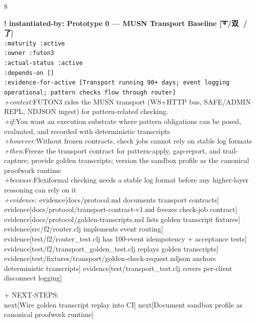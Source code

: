 \documentclass[landscape]{article}
\newcommand{\flexitag}[1]{\textcolor[gray]{0.35}{\textit{#1}}}
\newenvironment{devmapactive}{%
  \def\FrameCommand{\colorbox{devmapactivebg}}%
  \setlength{\fboxsep}{2pt}%
  \MakeFramed{\advance\hsize-\width \FrameRestore}%
}{\endMakeFramed}
\begin{document}
\begin{paracol}{8}
\par
\par
\begin{devmapactive}
\textbf{! instantiated-by: Prototype 0 — MUSN Transport Baseline [➰/双 🎑/了]}\\
  \texttt{:\allowbreak{}maturity :\allowbreak{}active}\\
  \texttt{:\allowbreak{}owner :\allowbreak{}futon3}\\
  \texttt{:\allowbreak{}actual-\allowbreak{}status :\allowbreak{}active}\\
  \texttt{:\allowbreak{}depends-\allowbreak{}on []}\\
  \texttt{:\allowbreak{}evidence-\allowbreak{}for-\allowbreak{}active [Transport running 90+\allowbreak{} days;\allowbreak{} event logging operational;\allowbreak{} pattern checks flow through router]}\\
  \flexitag{+context:}FUTON3 rides the MUSN transport (WS+HTTP bus, SAFE/ADMIN REPL, NDJSON ingest) for pattern-related checking.\\
  \flexitag{+if:}You want an execution substrate where pattern obligations can be posed, evaluated, and recorded with deterministic transcripts\\
  \flexitag{+however:}Without frozen contracts, check jobs cannot rely on stable log formats\\
  \flexitag{+then:}Freeze the transport contract for pattern-apply, gap-report, and trail-capture; provide golden transcripts; version the sandbox profile as the canonical proofwork runtime\\
  \flexitag{+because:}Flexiformal checking needs a stable log format before any higher-layer reasoning can rely on it\\
  \flexitag{+evidence:} evidence[docs/protocol.md documents transport contracts] evidence[docs/protocol/transport-contract-v1.md freezes check-job contract] evidence[docs/protocol/golden-transcripts.md lists golden transcript fixtures] evidence[src/f2/router.clj implements event routing] evidence[test/f2/router\_test.clj has 100-event idempotency + acceptance tests] evidence[test/f2/transport\_golden\_test.clj replays golden transcripts] evidence[test/fixtures/transport/golden-check-request.ndjson anchors deterministic transcripts] evidence[test/transport\_test.clj covers per-client disconnect logging]\\
\par
  + NEXT-STEPS:\\
    next[Wire golden transcript replay into CI] next[Document sandbox profile as canonical proofwork runtime]\\

\end{devmapactive}
\end{paracol}
\end{document}
